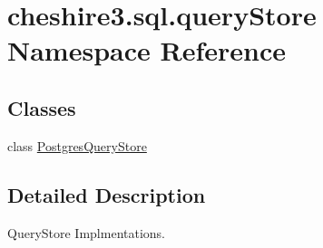 \hypertarget{namespacecheshire3_1_1sql_1_1query_store}{\section{cheshire3.\-sql.\-query\-Store Namespace Reference}
\label{namespacecheshire3_1_1sql_1_1query_store}
}
\subsection*{Classes}
\begin{DoxyCompactItemize}
\item 
class \hyperlink{classcheshire3_1_1sql_1_1query_store_1_1_postgres_query_store}{Postgres\-Query\-Store}
\end{DoxyCompactItemize}


\subsection{Detailed Description}
\begin{DoxyVerb}QueryStore Implmentations.\end{DoxyVerb}
 